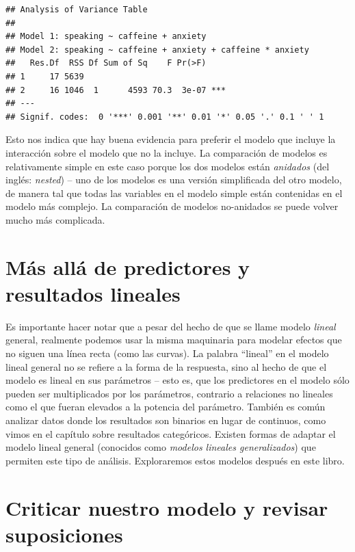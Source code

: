 \documentclass[
  12pt,
]{book}
\begin{document}
\begin{verbatim}
## Analysis of Variance Table
## 
## Model 1: speaking ~ caffeine + anxiety
## Model 2: speaking ~ caffeine + anxiety + caffeine * anxiety
##   Res.Df  RSS Df Sum of Sq    F Pr(>F)    
## 1     17 5639                             
## 2     16 1046  1      4593 70.3  3e-07 ***
## ---
## Signif. codes:  0 '***' 0.001 '**' 0.01 '*' 0.05 '.' 0.1 ' ' 1
\end{verbatim}

Esto nos indica que hay buena evidencia para preferir el modelo que incluye la interacción sobre el modelo que no la incluye. La comparación de modelos es relativamente simple en este caso porque los dos modelos están \emph{anidados} (del inglés: \emph{nested}) -- uno de los modelos es una versión simplificada del otro modelo, de manera tal que todas las variables en el modelo simple están contenidas en el modelo más complejo. La comparación de modelos no-anidados se puede volver mucho más complicada.

\hypertarget{muxe1s-alluxe1-de-predictores-y-resultados-lineales}{%
\section{Más allá de predictores y resultados lineales}\label{muxe1s-alluxe1-de-predictores-y-resultados-lineales}}

Es importante hacer notar que a pesar del hecho de que se llame modelo \emph{lineal} general, realmente podemos usar la misma maquinaria para modelar efectos que no siguen una línea recta (como las curvas). La palabra ``lineal'' en el modelo lineal general no se refiere a la forma de la respuesta, sino al hecho de que el modelo es lineal en sus parámetros -- esto es, que los predictores en el modelo sólo pueden ser multiplicados por los parámetros, contrario a relaciones no lineales como el que fueran elevados a la potencia del parámetro. También es común analizar datos donde los resultados son binarios en lugar de continuos, como vimos en el capítulo sobre resultados categóricos. Existen formas de adaptar el modelo lineal general (conocidos como \emph{modelos lineales generalizados}) que permiten este tipo de análisis. Exploraremos estos modelos después en este libro.

\hypertarget{model-criticism}{%
\section{Criticar nuestro modelo y revisar suposiciones}\label{model-criticism}}
\end{document}
